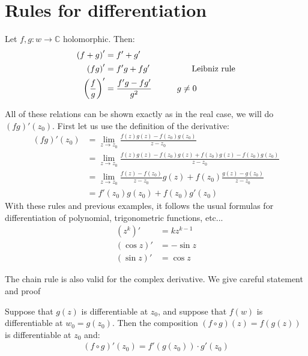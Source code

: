 \section{Rules for differentiation}
\begin{theoreme}
Let $f, g: w \to \mathbb{C}$ holomorphic. Then:
\begin{align*} 
	\left(f + g\right)' &= f' + g'\\
	\left(fg\right)' &= f'g + fg' \mathspace \mathspace\mathspace \mathspace \mathspace \text{Leibniz rule}\\
	\left(\frac{f}{g}\right)' &= \frac{f'g - fg'}{g^2} \mathspace \mathspace \mathspace g \neq 0
\end{align*}
\end{theoreme}
All of these relations can be shown exactly as in the real case, we will do $\left(fg\right)'\left(z_0\right)$. First let us use the definition of the derivative:
\begin{align*} 
	\left(fg\right)'\left(z_0\right) &= \lim_{z \to z_0} \frac{f\left(z\right)g\left(z\right) - f\left(z_0\right)g\left(z_0\right)}{z - z_0}\\
									 &= \lim_{z \to z_0} \frac{f\left(z\right)g\left(z\right) - f\left(z_0\right)g\left(z\right) + f\left(z_0\right)g\left(z\right) - f\left(z_0\right)g\left(z_0\right)}{z - z_0}\\
									 &= \lim_{z \to z_0} \frac{f\left(z\right) - f\left(z_0\right)}{z - z_0}g\left(z\right) + f\left(z_0\right)\frac{g\left(z\right) - g\left(z_0\right)}{z - z_0}\\
									 &= f'\left(z_0\right)g\left(z_0\right) + f\left(z_0\right)g'\left(z_0\right)
\end{align*}
With these rules and previous examples, it follows the usual formulas for differentiation of polynomial, trigonometric functions, etc...
\begin{align*} 
	\left(z^{k}\right)' &=  kz^{k-1}\\
	\left(\cos z\right)' &= -\sin z\\
	\left(\sin z\right)' &= \cos z
\end{align*}



The chain rule is also valid for the complex derivative. We give careful statement and proof



\begin{theoreme}
	Suppose that $g\left(z\right)$ is differentiable at $z_0$, and suppose that $f\left(w\right)$ is differentiable at $w_0 = g\left(z_0\right)$. Then the composition $\left(f \circ g\right)\left(z\right) = f\left(g\left(z\right)\right)$ is differentiable at $z_0$ and:
\begin{align*} 
	\left(f \circ g\right)'\left(z_0\right) =  f'\left(g\left(z_0\right)\right) \cdot g'\left(z_0\right)
\end{align*}
\end{theoreme}

